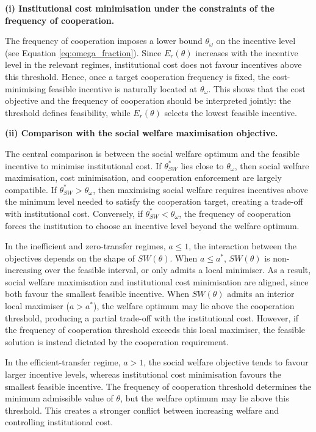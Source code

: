 \documentclass{article}
\begin{document}
\textbf{(i) Institutional cost minimisation under the constraints of the frequency of cooperation.} 

The frequency of cooperation imposes a lower bound $\theta_\omega$ on the incentive level (see  Equation \ref{eq:omega_fraction}). Since $E_r(\theta)$ increases with the incentive level in the relevant regimes, institutional cost does not favour incentives above this threshold. Hence, once a target cooperation frequency is fixed, the cost-minimising feasible incentive is naturally located at $\theta_\omega$. This shows that the cost objective and the frequency of cooperation should be interpreted jointly: the threshold defines feasibility, while $E_r(\theta)$ selects the lowest feasible incentive.

\textbf{(ii) Comparison with the social welfare maximisation objective.}

The central comparison is between the social welfare optimum and the feasible incentive to minimise institutional cost. If $\theta^*_{SW}$ lies close to $\theta_\omega$, then social welfare maximisation, cost minimisation, and cooperation enforcement are largely compatible. If $\theta^*_{SW}>\theta_\omega$, then maximising social welfare requires incentives above the minimum level needed to satisfy the cooperation target, creating a trade-off with institutional cost. Conversely, if $\theta^*_{SW}<\theta_\omega$, the frequency of cooperation forces the institution to choose an incentive level beyond the welfare optimum.

In the inefficient and zero-transfer regimes, $a \le 1$, the interaction between the objectives depends on the shape of $SW(\theta)$. When $a \le a^*\text{, }SW(\theta)$ is non-increasing over the feasible interval, or only admits a local minimiser. As a result, social welfare maximisation and institutional cost minimisation are aligned, since both favour the smallest feasible incentive. When $SW(\theta)$ admits an interior local maximiser ($a > a^*$), the welfare optimum may lie above the cooperation threshold, producing a partial trade-off with the institutional cost. However, if the frequency of cooperation threshold exceeds this local maximiser, the feasible solution is instead dictated by the cooperation requirement.

In the efficient-transfer regime, $a>1$, the social welfare objective tends to favour larger incentive levels, whereas institutional cost minimisation favours the smallest feasible incentive. The frequency of cooperation threshold determines the minimum admissible value of $\theta$, but the welfare optimum may lie above this threshold. This creates a stronger conflict between increasing welfare and controlling institutional cost.
\end{document}
